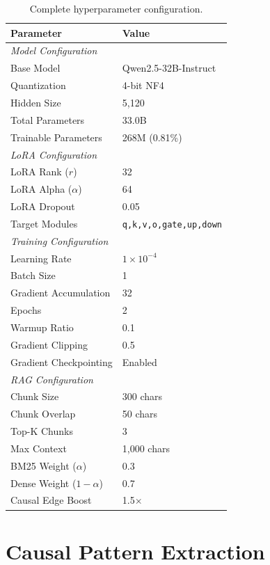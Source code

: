 \documentclass[11pt]{article}
\begin{document}
\begin{table}[h]
\centering
\small
\begin{tabular}{ll}
\toprule
\textbf{Parameter} & \textbf{Value} \\
\midrule
\multicolumn{2}{l}{\textit{Model Configuration}} \\
Base Model & Qwen2.5-32B-Instruct \\
Quantization & 4-bit NF4 \\
Hidden Size & 5,120 \\
Total Parameters & 33.0B \\
Trainable Parameters & 268M (0.81\%) \\
\midrule
\multicolumn{2}{l}{\textit{LoRA Configuration}} \\
LoRA Rank ($r$) & 32 \\
LoRA Alpha ($\alpha$) & 64 \\
LoRA Dropout & 0.05 \\
Target Modules & \texttt{q,k,v,o,gate,up,down} \\
\midrule
\multicolumn{2}{l}{\textit{Training Configuration}} \\
Learning Rate & $1 \times 10^{-4}$ \\
Batch Size & 1 \\
Gradient Accumulation & 32 \\
Epochs & 2 \\
Warmup Ratio & 0.1 \\
Gradient Clipping & 0.5 \\
Gradient Checkpointing & Enabled \\
\midrule
\multicolumn{2}{l}{\textit{RAG Configuration}} \\
Chunk Size & 300 chars \\
Chunk Overlap & 50 chars \\
Top-K Chunks & 3 \\
Max Context & 1,000 chars \\
BM25 Weight ($\alpha$) & 0.3 \\
Dense Weight ($1{-}\alpha$) & 0.7 \\
Causal Edge Boost & 1.5$\times$ \\
\bottomrule
\end{tabular}
\caption{Complete hyperparameter configuration.}
\label{tab:hyperparams}
\end{table}

\section{Causal Pattern Extraction}
\label{app:patterns}
\end{document}
